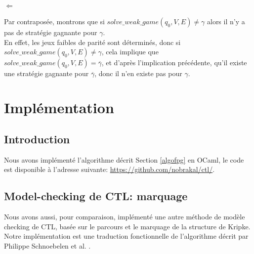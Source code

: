 \documentclass[10pt,a4paper]{article}
\begin{document}
\paragraph{$\Longleftarrow$}
Par contraposée, montrons que si $solve\_weak\_game(q_0,V,E) \neq \gamma$ alors il n'y a pas de stratégie gagnante pour $\gamma$.\\
En effet, les jeux faibles de parité sont déterminés, donc si $solve\_weak\_game(q_0,V,E) \neq \gamma$, cela implique que $solve\_weak\_game(q_0,V,E) = \overline{\gamma}$, et d'après l'implication précédente, qu'il existe une stratégie gagnante pour $\overline{\gamma}$, donc il n'en existe pas pour $\gamma$.

\section{Implémentation}
\subsection{Introduction}
Nous avons implémenté l'algorithme décrit Section \ref{algofpg} en OCaml, le code est disponible à l'adresse suivante: \url{https://github.com/nobrakal/ctl/}.

\subsection{Model-checking de CTL: marquage}
Nous avons aussi, pour comparaison, implémenté une autre méthode de modèle checking de CTL, basée sur le parcours et le marquage de la structure de Kripke. Notre implémentation est une traduction fonctionnelle de l'algorithme décrit par Philippe Schnoebelen et al. \cite{verif}.



\end{document}
